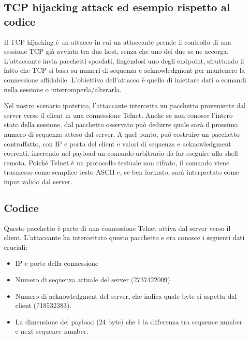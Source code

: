 \documentclass{report}
\begin{document}
\subsection{TCP hijacking attack ed esempio rispetto al codice}
Il TCP hijacking è un attacco in cui un attaccante prende il controllo di una sessione TCP già avviata tra due host, senza che uno dei due se ne accorga. L'attaccante invia pacchetti spoofati, fingendosi uno degli
endpoint, sfruttando il fatto che TCP si basa su numeri di sequenza e acknowledgment per mantenere la connessione affidabile. L'obiettivo dell'attacco è quello di iniettare dati o comandi nella sessione o interromperla/alterarla.

\noindent Nel nostro scenario ipotetico, l'attaccante intercetta un pacchetto proveniente dal server verso il client in una connessione Telnet. Anche se non conosce l'intero stato della sessione, dal pacchetto osservato può dedurre quale sarà il prossimo numero di sequenza atteso dal server.
A quel punto, può costruire un pacchetto contraffatto, con IP e porta del client e valori di sequenza e acknowledgment coerenti, inserendo nel payload un comando arbitrario da far eseguire alla shell remota. 
Poiché Telnet è un protocollo testuale non cifrato, il comando viene trasmesso come semplice testo ASCII e, se ben formato, sarà interpretato come input valido dal server.

\subsection{Codice}
Questo pacchetto è parte di una connessione Telnet attiva dal server verso il client. L'attaccante ha intercettato questo pacchetto e ora conosce i seguenti dati cruciali:
\begin{itemize}
    \item IP e porte della connessione
    \item Numero di sequenza attuale del server (2737422009)
    \item Numero di acknowledgment del server, che indica quale byte si aspetta dal client (718532383).
    \item La dimensione del payload (24 byte) che è la differenza tra sequence number e next sequence number.
\end{itemize}
\end{document}
